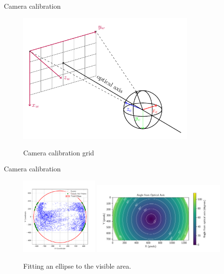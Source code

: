 \documentclass{beamer}
\begin{document}
\begin{frame}{Camera calibration}
   
   \begin{figure}[H]
        \centering
        \includegraphics[width=0.8\textwidth]{../fig/tikz/extrinsic.pdf}
        \label{fig:calib1}
        \caption{Camera calibration grid}
    \end{figure}
    
\end{frame}

\begin{frame}{Camera calibration}
   
   \begin{figure}[H]
	\centering
	  \includegraphics[width=0.35\textwidth]{./fig/pgfplot/build/ellipse_hull.pdf}
	  \includegraphics[width=0.6\textwidth]{./fig/pgfplot/build/evk4_viz.pdf}

	\caption{Fitting an ellipse to the visible area.}
	\label{fig:calib2}
    \end{figure}
    
\end{frame}
\end{document}
